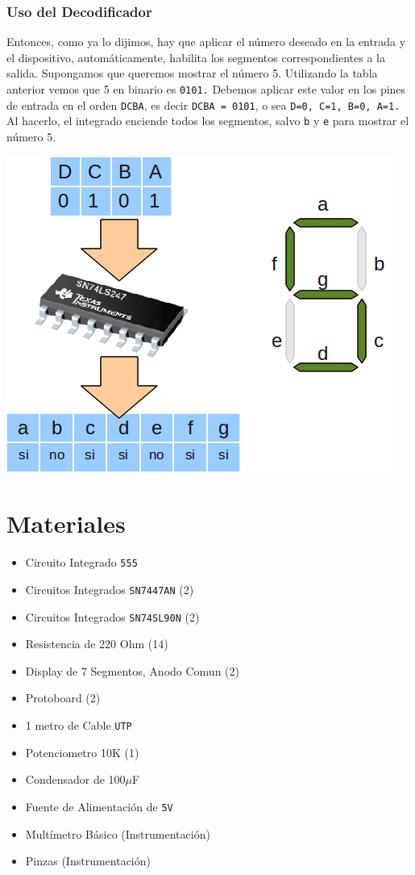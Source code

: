 \documentclass[10pt,letterpaper]{article}
\begin{document}
\subsubsection{Uso del  Decodificador}
Entonces, como ya lo dijimos, hay que aplicar el número deseado en la entrada y el dispositivo, automáticamente, habilita los segmentos correspondientes a la salida. Supongamos que queremos mostrar el número 5. Utilizando la tabla anterior vemos que 5 en binario es \texttt{0101.} Debemos aplicar este valor en los pines de entrada en el orden \texttt{DCBA}, es decir \texttt{DCBA = 0101}, o sea \texttt{D=0, C=1, B=0, A=1.} Al hacerlo, el integrado enciende todos los segmentos, salvo \texttt{b} y \texttt{e} para mostrar el número 5.
\begin{center}
\includegraphics[scale=0.75]{Ejemplo7447}
\end{center}
\section{Materiales}
\begin{itemize}
\item Circuito Integrado \texttt{555}
\item Circuitos Integrados \texttt{SN7447AN} (2)
\item Circuitos Integrados \texttt{SN74SL90N} (2)
\item Resistencia de 220 Ohm (14)
\item Display de 7 Segmentos, Anodo Comun (2)
\item Protoboard (2)
\item 1 metro de Cable \texttt{UTP}
\item Potenciometro 10K (1)
\item Condensador de 100$\mu$F
\item Fuente de Alimentación de \texttt{5V}
\item Multímetro Básico (Instrumentación)
\item Pinzas (Instrumentación)
\end{itemize}
\end{document}
